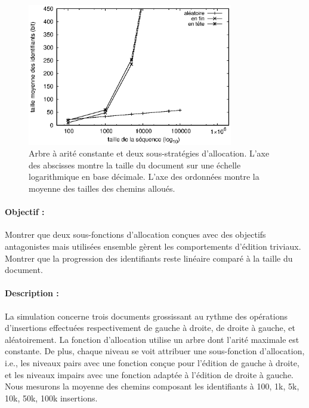 \begin{figure}
  \begin{center}
    \includegraphics[width=0.8\textwidth]{img/lseq/robin.eps}
    \caption[Influence de deux sous-fonctions d'allocations sur la taille des
    chemins] {\label{repl:img:suballocation} Arbre à arité constante et deux
      sous-stratégies d'allocation. L'axe des abscisses montre la taille du
      document sur une échelle logarithmique en base décimale. L'axe des
      ordonnées montre la moyenne des tailles des chemins alloués.}
  \end{center}
\end{figure}

\paragraph{Objectif :} Montrer que deux sous-fonctions d'allocation conçues avec
des objectifs antagonistes mais utilisées ensemble gèrent les comportements
d'édition triviaux. Montrer que la progression des identifiants reste linéaire
comparé à la taille du document.

\paragraph{Description :} La simulation concerne trois documents grossissant au
rythme des opérations d'insertions effectuées respectivement de gauche à droite,
de droite à gauche, et aléatoirement. La fonction d'allocation utilise un arbre
dont l'arité maximale est constante. De plus, chaque niveau se voit attribuer
une sous-fonction d'allocation, i.e., les niveaux pairs avec une fonction conçue
pour l'édition de gauche à droite, et les niveaux impairs avec une fonction
adaptée à l'édition de droite à gauche. Nous mesurons la moyenne des chemins
composant les identifiants à 100, 1k, 5k, 10k, 50k, 100k insertions.


